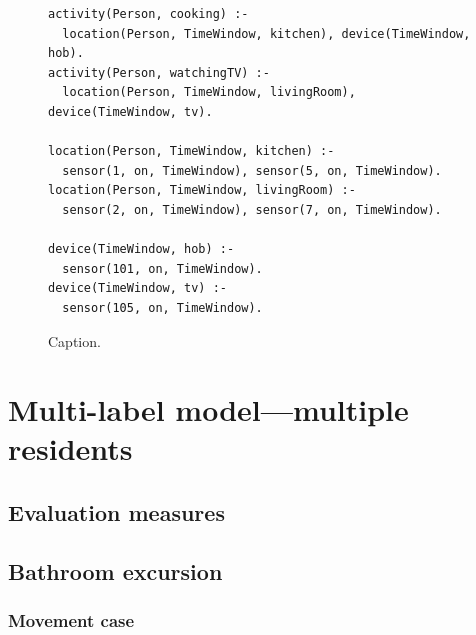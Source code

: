 \documentclass[12pt, a4paper, pdflatex, leqno, twoside, openright]{report}
\begin{document}
\begin{figure}[htb] %
  \begin{verbatim}
activity(Person, cooking) :-
  location(Person, TimeWindow, kitchen), device(TimeWindow, hob).
activity(Person, watchingTV) :-
  location(Person, TimeWindow, livingRoom), device(TimeWindow, tv).

location(Person, TimeWindow, kitchen) :-
  sensor(1, on, TimeWindow), sensor(5, on, TimeWindow).
location(Person, TimeWindow, livingRoom) :-
  sensor(2, on, TimeWindow), sensor(7, on, TimeWindow).

device(TimeWindow, hob) :-
  sensor(101, on, TimeWindow).
device(TimeWindow, tv) :-
  sensor(105, on, TimeWindow).
  \end{verbatim}
  \caption{Caption.\label{lst:label}}
\end{figure}





\chapter{Multi-label model---multiple residents\label{ch:mlm}}
  \section{Evaluation measures}
  \section{Bathroom excursion}
    \subsection{Movement case}
\end{document}
